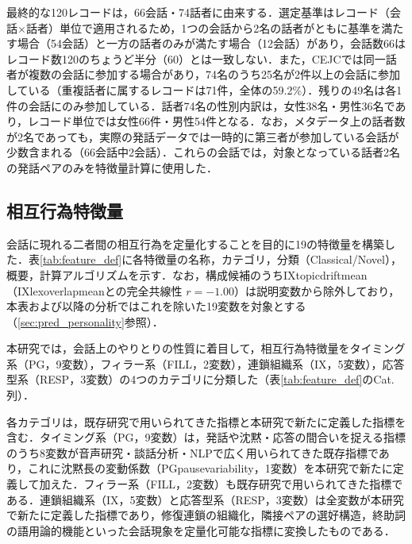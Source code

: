 \documentclass[dvipdfmx,11pt,a4paper]{bxjsarticle}
\renewcommand{\_}{\paperorigunderscore\allowbreak}%
\begin{document}

最終的な120レコードは，66会話・74話者に由来する．選定基準はレコード（会話$\times$話者）単位で適用されるため，1つの会話から2名の話者がともに基準を満たす場合（54会話）と一方の話者のみが満たす場合（12会話）があり，会話数66はレコード数120のちょうど半分（60）とは一致しない．また，CEJCでは同一話者が複数の会話に参加する場合があり，74名のうち25名が2件以上の会話に参加している（重複話者に属するレコードは71件，全体の59.2\%）．残りの49名は各1件の会話にのみ参加している．話者74名の性別内訳は，女性38名・男性36名であり，レコード単位では女性66件・男性54件となる．なお，メタデータ上の話者数が2名であっても，実際の発話データでは一時的に第三者が参加している会話が少数含まれる（66会話中2会話）．これらの会話では，対象となっている話者2名の発話ペアのみを特徴量計算に使用した．




\subsection{相互行為特徴量}
\label{sec:features}


会話に現れる二者間の相互行為を定量化することを目的に19の特徴量を構築した．表\ref{tab:feature_def}に各特徴量の名称，カテゴリ，分類（Classical/Novel），概要，計算アルゴリズムを示す．なお，構成候補のうちIX\_topic\_drift\_mean（IX\_lex\_overlap\_meanとの完全共線性 $r=-1.00$）は説明変数から除外しており，本表および以降の分析ではこれを除いた19変数を対象とする（\ref{sec:pred_personality}参照）．



本研究では，会話上のやりとりの性質に着目して，相互行為特徴量をタイミング系（PG，9変数），フィラー系（FILL，2変数），連鎖組織系（IX，5変数），応答型系（RESP，3変数）の4つのカテゴリに分類した（表\ref{tab:feature_def}のCat.列）．

各カテゴリは，既存研究で用いられてきた指標と本研究で新たに定義した指標を含む．タイミング系（PG，9変数）は，発話や沈黙・応答の間合いを捉える指標のうち8変数が音声研究・談話分析・NLPで広く用いられてきた既存指標であり，これに沈黙長の変動係数（PG\_pause\_variability，1変数）を本研究で新たに定義して加えた．フィラー系（FILL，2変数）も既存研究で用いられてきた指標である．連鎖組織系（IX，5変数）と応答型系（RESP，3変数）は全変数が本研究で新たに定義した指標であり，修復連鎖の組織化\cite{schegloff1977}，隣接ペアの選好構造\cite{sacks1974}，終助詞の語用論的機能といった会話現象を定量化可能な指標に変換したものである．
\end{document}

